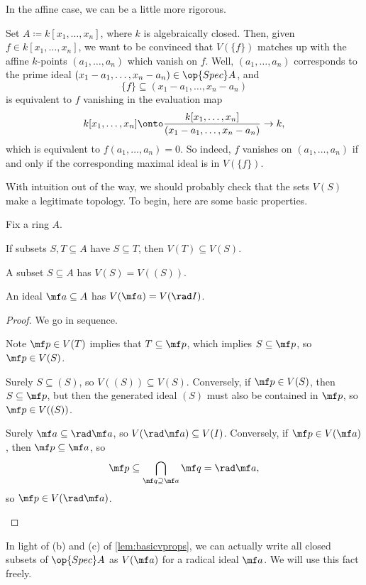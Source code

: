 \documentclass[../notes.tex]{subfiles}
\begin{document}
In the affine case, we can be a little more rigorous.
\begin{example}
	Set $A\coloneqq k[x_1,\ldots,x_n]$, where $k$ is algebraically closed. Then, given $f\in k[x_1,\ldots,x_n]$, we want to be convinced that $V(\{f\})$ matches up with the affine $k$-points $(a_1,\ldots,a_n)$ which vanish on $f$. Well, $(a_1,\ldots,a_n)$ corresponds to the prime ideal $(x_1-a_1,\ldots,x_n-a_n)\in\op{Spec}A$, and
	\[\{f\}\subseteq(x_1-a_1,\ldots,x_n-a_n)\]
	is equivalent to $f$ vanishing in the evaluation map
	\[k[x_1,\ldots,x_n]\onto\frac{k[x_1,\ldots,x_n]}{(x_1-a_1,\ldots,x_n-a_n)}\to k,\]
	which is equivalent to $f(a_1,\ldots,a_n)=0$. So indeed, $f$ vanishes on $(a_1,\ldots,a_n)$ if and only if the corresponding maximal ideal is in $V(\{f\})$.
\end{example}
With intuition out of the way, we should probably check that the sets $V(S)$ make a legitimate topology. To begin, here are some basic properties.
\begin{lemma} \label{lem:basicvprops}
	Fix a ring $A$.
	\begin{listalph}
		\item If subsets $S,T\subseteq A$ have $S\subseteq T$, then $V(T)\subseteq V(S)$.
		\item A subset $S\subseteq A$ has $V(S)=V((S))$.
		\item An ideal $\mf a\subseteq A$ has $V(\mf a)=V(\rad I)$.
	\end{listalph}
\end{lemma}
\begin{proof}
	We go in sequence.
	\begin{listalph}
		\item Note $\mf p\in V(T)$ implies that $T\subseteq\mf p$, which implies $S\subseteq\mf p$, so $\mf p\in V(S)$.
		\item Surely $S\subseteq(S)$, so $V((S))\subseteq V(S)$. Conversely, if $\mf p\in V(S)$, then $S\subseteq\mf p$, but then the generated ideal $(S)$ must also be contained in $\mf p$, so $\mf p\in V((S))$.
		\item Surely $\mf a\subseteq\rad\mf a$, so $V(\rad\mf a)\subseteq V(I)$. Conversely, if $\mf p\in V(\mf a)$, then $\mf p\subseteq\mf a$, so
		\[\mf p\subseteq\bigcap_{\mf q\supseteq\mf a}\mf q=\rad\mf a,\]
		so $\mf p\in V(\rad\mf a)$.
		\qedhere
	\end{listalph}
\end{proof}
\begin{remark}
	In light of (b) and (c) of \autoref{lem:basicvprops}, we can actually write all closed subsets of $\op{Spec}A$ as $V(\mf a)$ for a radical ideal $\mf a$. We will use this fact freely.
\end{remark}
\end{document}
